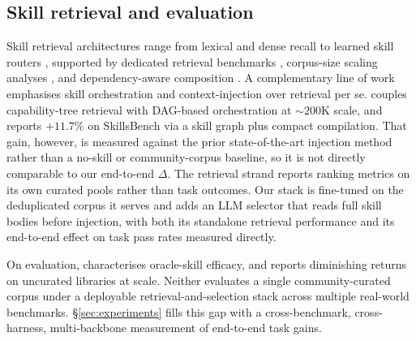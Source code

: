 \subsection{Skill retrieval and evaluation}

Skill retrieval architectures range from lexical and dense
recall to learned skill routers \citep{SkillRouter2026},
supported by dedicated retrieval benchmarks \citep{SkillRet2026},
corpus-size scaling analyses \citep{ScalingLaws2026}, and
dependency-aware composition \citep{GraphOfSkills2026}.  A
complementary line of work emphasises skill orchestration and
context-injection over retrieval per se.
\citet{AgentSkillOS2026} couples capability-tree retrieval with
DAG-based orchestration at $\sim$$200$K scale, and
\citet{SkillRAE2026} reports $+11.7\%$ on SkillsBench via a
skill graph plus compact compilation.  That gain, however, is
measured against the prior state-of-the-art injection method
rather than a no-skill or community-corpus baseline, so it is not
directly comparable to our end-to-end $\Delta$.
The retrieval strand reports ranking metrics on its
own curated pools rather than task outcomes.  Our
stack is fine-tuned on the deduplicated
corpus it serves and adds an LLM selector that reads full skill
bodies before injection, with both its standalone retrieval
performance and its end-to-end effect on task pass rates
measured directly.

On evaluation, \citet{SkillsBench2026} characterises oracle-skill
efficacy, and \citet{UCSBSkillsWild2026} reports diminishing
returns on uncurated libraries at scale.  Neither
evaluates a single community-curated corpus under a
deployable retrieval-and-selection stack across multiple
real-world benchmarks.  \S\ref{sec:experiments} fills this gap
with a cross-benchmark, cross-harness, multi-backbone measurement
of end-to-end task gains.
